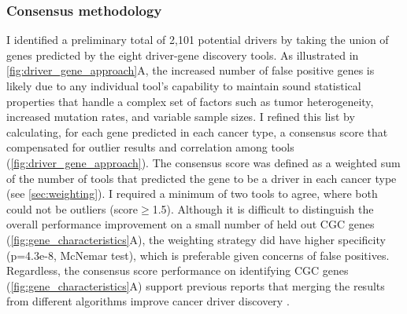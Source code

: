 \subsubsection{Consensus methodology}
I identified a preliminary total of 2,101 potential drivers by taking the union of genes predicted by the eight driver-gene discovery tools.  As illustrated in \autoref{fig:driver_gene_approach}A, the increased number of false positive genes is likely due to any individual tool's capability to maintain sound statistical properties that handle a complex set of factors such as tumor heterogeneity, increased mutation rates, and variable sample sizes. I refined this list by calculating, for each gene predicted in each cancer type, a consensus score that compensated for outlier results and correlation among tools (\autoref{fig:driver_gene_approach}). The consensus score was defined as a weighted sum of the number of tools that predicted the gene to be a driver in each cancer type (see \autoref{sec:weighting}). I required a minimum of two tools to agree, where both could not be outliers (score$\geq$1.5). Although it is difficult to distinguish the overall performance improvement on a small number of held out CGC genes (\autoref{fig:gene_characteristics}A), the weighting strategy did have higher specificity (p=4.3e-8, McNemar test), which is preferable given concerns of false positives. Regardless, the consensus score performance on identifying CGC genes (\autoref{fig:gene_characteristics}A) support previous reports that merging the results from different algorithms improve cancer driver discovery \cite{RN96}. 


